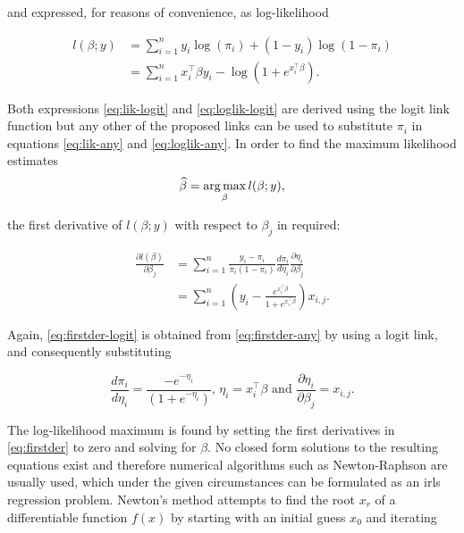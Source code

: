 and expressed, for reasons of convenience, as log-likelihood

\begin{subequations}
\begin{align}
  l(\beta; y) &= \sum_{i=1}^n y_i \log(\pi_i) + (1-y_i) \log(1-\pi_i) \label{eq:loglik-any} \\
  &= \sum_{i=1}^n x_i^\intercal \beta y_i -  \log\left(1+e^{x_i^\intercal \beta}\right). \label{eq:loglik-logit}
\end{align}
\end{subequations}

Both expressions \ref{eq:lik-logit} and \ref{eq:loglik-logit} are derived using the logit link function but any other of the proposed links can be used to substitute $\pi_i$ in equations \ref{eq:lik-any} and \ref{eq:loglik-any}. In order to find the maximum likelihood estimates
\begin{equation}
\widehat{\beta} = \operatorname*{arg\, max}_{\beta} l(\beta; y), 
\end{equation}

the first derivative of $l(\beta; y)$ with respect to $\beta_j$ in required:

\begin{subequations}\label{eq:firstder}
\begin{align}
  \frac{\partial l(\beta)}{\partial \beta_j} &= \sum_{i=1}^n \frac{y_i - \pi_i}{\pi_i (1-\pi_i)} \frac{d \pi_i}{d \eta_i} \frac{\partial \eta_i}{\partial \beta_j} \label{eq:firstder-any} \\
  &= \sum_{i=1}^n \left(y_i - \frac{e^{x_i^\intercal \beta}}{1+e^{x_i^\intercal \beta}}\right) x_{i,j} . \label{eq:firstder-logit}
\end{align}
\end{subequations}

Again, \ref{eq:firstder-logit} is obtained from \ref{eq:firstder-any} by using a logit link, and consequently substituting 

\begin{equation*}
  \frac{d \pi_i}{d \eta_i} = \frac{-e^{-\eta_i}}{(1+e^{-\eta_i})} \text{,\ \ } \eta_i = x_i^\intercal \beta \text{\ \ and\ \ } \frac{\partial \eta_i}{\partial \beta_j} = x_{i,j}.
\end{equation*}

The log-likelihood maximum is found by setting the first derivatives in \ref{eq:firstder} to zero and solving for $\beta$. No closed form solutions to the resulting equations exist and therefore numerical algorithms such as Newton-Raphson are usually used, which under the given circumstances can be formulated as an \gls{irls} regression problem. Newton's method attempts to find the root $x_r$ of a differentiable function $f(x)$ by starting with an initial guess $x_0$ and iterating

